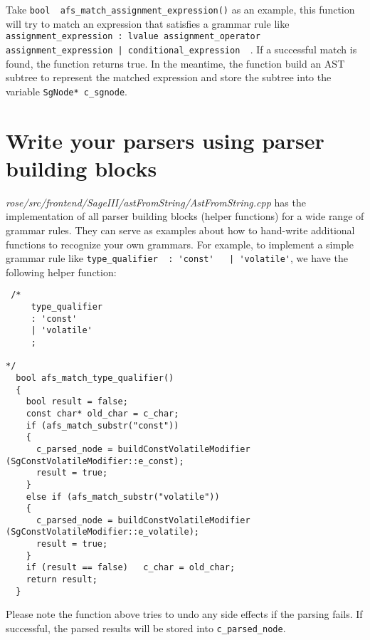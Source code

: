 Take \lstinline{bool  afs_match_assignment_expression()} as an example, this function will try to match an expression that satisfies a grammar rule like
\lstinline{assignment_expression : lvalue assignment_operator assignment_expression | conditional_expression  }. If a successful match is found, the function returns true.
In the meantime, the function build an AST subtree to represent the matched expression and store the subtree into the variable \lstinline{SgNode* c_sgnode}.  

\section{Write your parsers using parser building blocks}
\textit{rose/src/frontend/SageIII/astFromString/AstFromString.cpp} has the implementation of all parser building blocks (helper functions) for a wide range of grammar rules. 
They can serve as examples about how to hand-write additional functions to recognize your own grammars. 
For example, to implement a simple grammar rule like \lstinline{type_qualifier  : 'const'   | 'volatile'}, we have the following helper function:
\begin{verbatim}
 /*
     type_qualifier
     : 'const'
     | 'volatile'
     ;

*/
  bool afs_match_type_qualifier()
  {
    bool result = false;
    const char* old_char = c_char;
    if (afs_match_substr("const"))
    {
      c_parsed_node = buildConstVolatileModifier (SgConstVolatileModifier::e_const);
      result = true;
    }
    else if (afs_match_substr("volatile"))
    {
      c_parsed_node = buildConstVolatileModifier (SgConstVolatileModifier::e_volatile);
      result = true;
    }
    if (result == false)   c_char = old_char;
    return result;
  }
\end{verbatim}
Please note the function above tries to undo any side effects if the parsing fails. If successful, the parsed results will be stored into \lstinline{c_parsed_node}.

